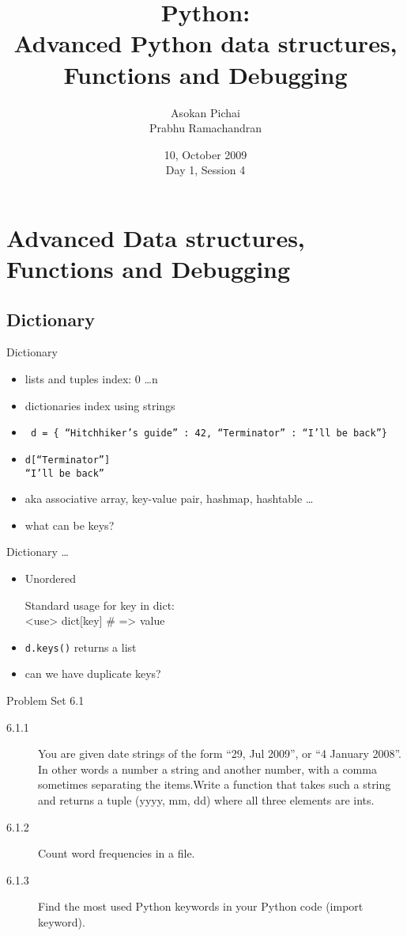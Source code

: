 \documentclass[14pt,compress]{beamer}
\title[Basic Python]{Python:\\Advanced Python data structures, Functions and Debugging}
\author[FOSSEE Team] {Asokan Pichai\\Prabhu Ramachandran}
\institute[IIT Bombay] {Department of Aerospace Engineering\\IIT Bombay}
\date[] {10, October 2009\\Day 1, Session 4}
\newcounter{time}
\newcommand{\inctime}[1]{\addtocounter{time}{#1}{\tiny \thetime\ m}}
\newcommand{\typ}[1]{\texttt{#1}}
\begin{document}
\begin{frame}
  \titlepage
\end{frame}

\section{Advanced Data structures, Functions and Debugging}

\subsection{Dictionary}
\begin{frame}{Dictionary}
  \begin{itemize}
    \item lists and tuples index: 0 \ldots n
    \item dictionaries index using strings
    \item \typ{ d = \{ ``Hitchhiker's guide'' : 42, ``Terminator'' : ``I'll be back''\}}
    \item \typ{d[``Terminator'']\\``I'll be back''}
    \item aka associative array, key-value pair, hashmap, hashtable \ldots    
    \item what can be keys?
  \end{itemize}
\end{frame}

\begin{frame}{Dictionary \ldots }
  \begin{itemize}
    \item \alert{Unordered}
      \begin{block}{Standard usage}
        for key in dict:\\
            <use> dict[key] \# => value
      \end{block}
    \item \typ{d.keys()} returns a list
    \item can we have duplicate keys?
  \end{itemize}
  \inctime{5}
\end{frame}

\begin{frame} {Problem Set 6.1}
  \begin{description}
\item[6.1.1] You are given date strings of the form ``29, Jul 2009'', or ``4 January 2008''. In other words a number a string and another number, with a comma sometimes separating the items.Write a function that takes such a string and returns a tuple (yyyy, mm, dd) where all three elements are ints.
    \item[6.1.2] Count word frequencies in a file.
    \item[6.1.3] Find the most used Python keywords in your Python code (import keyword).
\end{description}

\inctime{10}
\end{frame}
\end{document}

